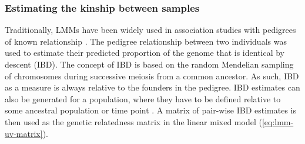 \subsubsection{Estimating the kinship between samples}
 \label{subsubsection:grm}
Traditionally, LMMs have been widely used in association studies with pedigrees of known relationship \citep{Eu-ahsunthornwattana2014}. The pedigree relationship between two individuals was used to estimate their predicted proportion of the genome that is identical by descent (IBD). The concept of IBD  is based on the random Mendelian sampling of chromosomes during successive meiosis from a common ancestor. As such, IBD as a measure is always relative to the founders in the pedigree. IBD estimates can also be generated for a population, where they have to be defined relative to some ancestral population or time point \citep{Browning2010,Glazner2012}. A matrix of pair-wise IBD estimates is then used as the genetic relatedness matrix  in the linear mixed model (\cref{eq:lmm-uv-matrix}).

